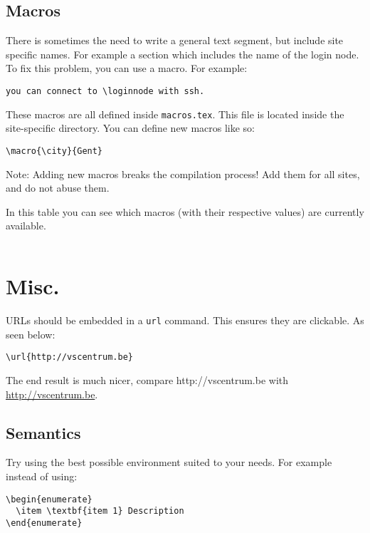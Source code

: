\documentclass[11pt,a4paper]{article}
\begin{document}
\subsection{Macros}
\label{sec:macros}

There is sometimes the need to write a general text segment, but include site
specific names. For example a section which includes the name of the login node.
To fix this problem, you can use a macro. For example:

\begin{verbatim}
you can connect to \loginnode with ssh.
\end{verbatim}

These macros are all defined inside \verb|macros.tex|. This file is located
inside the site-specific directory. You can define new macros like so:
\begin{verbatim}
\macro{\city}{Gent}
\end{verbatim}

Note: Adding new macros breaks the compilation process! Add them for all sites,
and do not abuse them.



In this table you can see which macros (with their respective values) are
currently available.

\begin{tabular}{|c|c|} \hline
  \maketabularrow{\thecnt} \\ \hline %
\end{tabular}

\section{Misc.}
\label{sec:misc}

URLs should be embedded in a \texttt{url} command. This ensures they are clickable. As seen below:
\begin{verbatim}
\url{http://vscentrum.be}
\end{verbatim}

The end result is much nicer, compare http://vscentrum.be with \url{http://vscentrum.be}.

\subsection{Semantics}

Try using the best possible environment suited to your needs. For example instead of using:
\begin{verbatim}
\begin{enumerate}
  \item \textbf{item 1} Description
\end{enumerate}
\end{verbatim}
\end{document}
